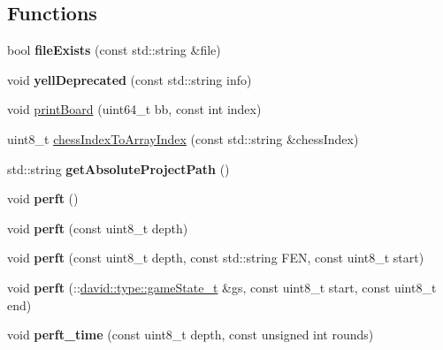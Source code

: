\subsection*{Functions}
\begin{DoxyCompactItemize}
\item 
\mbox{\label{namespaceutils_a14bd3ae16155806e72b98d3567d2f10c}} 
bool {\bfseries file\+Exists} (const std\+::string \&file)
\item 
\mbox{\label{namespaceutils_ad7045b98eab552a30b4d442c9d08367b}} 
void {\bfseries yell\+Deprecated} (const std\+::string info)
\item 
void \hyperlink{namespaceutils_a46add8ad404f7c6a4e29688660dc0bd0}{print\+Board} (uint64\+\_\+t bb, const int index)
\item 
uint8\+\_\+t \hyperlink{namespaceutils_a0a337e3860a76bb2f128b59445f0f270}{chess\+Index\+To\+Array\+Index} (const std\+::string \&chess\+Index)
\item 
\mbox{\label{namespaceutils_a31d4fc766d2fe07eb9ed3c1307464cd8}} 
std\+::string {\bfseries get\+Absolute\+Project\+Path} ()
\item 
\mbox{\label{namespaceutils_a079e1aa803d7c1f19e2602c960479c42}} 
void {\bfseries perft} ()
\item 
\mbox{\label{namespaceutils_ad53466aeb9373f945fafe858c9865dff}} 
void {\bfseries perft} (const uint8\+\_\+t depth)
\item 
\mbox{\label{namespaceutils_aaba51eb0be65c034f71d413ce8154299}} 
void {\bfseries perft} (const uint8\+\_\+t depth, const std\+::string F\+EN, const uint8\+\_\+t start)
\item 
\mbox{\label{namespaceutils_a25d5cc2f5e85583bc2166040f1132b38}} 
void {\bfseries perft} (\+::\hyperlink{structdavid_1_1bitboard_1_1gameState}{david\+::type\+::game\+State\+\_\+t} \&gs, const uint8\+\_\+t start, const uint8\+\_\+t end)
\item 
\mbox{\label{namespaceutils_a594bc5b2a28192ef8be24cee7c68f880}} 
void {\bfseries perft\+\_\+time} (const uint8\+\_\+t depth, const unsigned int rounds)

\end{DoxyCompactItemize}
